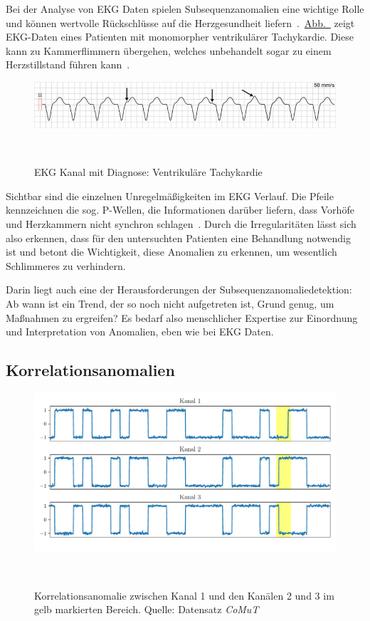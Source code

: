 Bei der Analyse von EKG Daten spielen Subsequenzanomalien eine wichtige Rolle und können wertvolle Rückschlüsse auf die Herzgesundheit
liefern~\cite{Chuah2007}.~\hyperref[fig:ekg_herzerkrankung]{Abb.~} zeigt EKG-Daten eines Patienten mit
monomorpher ventrikulärer Tachykardie. Diese kann zu Kammerflimmern übergehen, welches unbehandelt sogar zu einem Herzstillstand
führen kann~\cite{ekgecho}\Cite[S.~131~ff.]{Davies2015}.

\begin{figure}[h]
    \centering
    \includegraphics[width=0.85\linewidth]{ch4_anomalien/abbildungen/ventrikulaere_tachykardie.png}
    \caption{EKG Kanal mit Diagnose: Ventrikuläre Tachykardie~\cite{ekgecho}}
~\label{fig:ekg_herzerkrankung}
\end{figure}

Sichtbar sind die einzelnen Unregelmäßigkeiten im EKG Verlauf. Die Pfeile kennzeichnen die sog. P-Wellen, die Informationen darüber
liefern, dass Vorhöfe und Herzkammern nicht synchron schlagen~\cite{ekgecho}\Cite[S.~31~f.]{Davies2015}. Durch die Irregularitäten lässt
sich also erkennen, dass für den untersuchten Patienten eine Behandlung notwendig ist und betont die Wichtigkeit, diese Anomalien zu
erkennen, um wesentlich Schlimmeres zu verhindern.

Darin liegt auch eine der Herausforderungen der Subsequenzanomaliedetektion: Ab wann ist ein Trend, der so noch nicht aufgetreten ist,
Grund genug, um Maßnahmen zu ergreifen? Es bedarf also menschlicher Expertise zur Einordnung und Interpretation von Anomalien, eben wie
bei EKG Daten.

\subsection{Korrelationsanomalien}

\begin{figure}[H]
    \centering
    \includegraphics[width=0.95\linewidth]{ch4_anomalien/abbildungen/korrelationsanomalie.pdf}
    \caption{\centering Korrelationsanomalie zwischen Kanal 1 und den Kanälen 2 und 3 im gelb markierten Bereich. Quelle: Datensatz
        \textit{CoMuT}~\cite{NaumannCoMuT}}
~\label{fig:correlation_Anomaly}
\end{figure}

